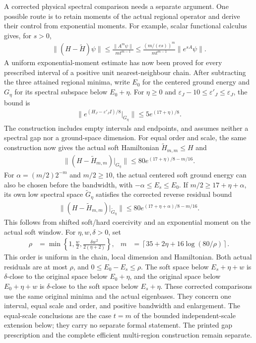 \documentclass{article}
\begin{document}
A corrected physical spectral comparison needs a separate argument.
One possible route is to retain moments of the actual regional operator
and derive their control from exponential moments. For example, scalar
functional calculus gives, for $s>0$,
\begin{align}
    \|(H-\widetilde H)\psi\|
    \le\frac{\|A^m\psi\|}{m t^{m-1}}
    \le\frac{(m/(es))^m}{m t^{m-1}}\|e^{sA}\psi\|.
    \label{eq:alvv_soft_possible_route}
\end{align}
A uniform exponential-moment estimate has now been proved for every
prescribed interval of a positive unit nearest-neighbour chain. After
subtracting the three attained regional minima, write $E_0$ for the
centered ground energy and $G_\eta$ for its spectral subspace below
$E_0+\eta$. For $\eta\ge0$ and
$\varepsilon_J-10\le\varepsilon'_J\le\varepsilon_J$, the bound is
\begin{align}
    \bigl\|e^{(H_J-\varepsilon'_J I)/8}|_{G_\eta}\bigr\|
    \le 5e^{(17+\eta)/8}.
    \label{eq:alvv_soft_window_exponential_bound}
\end{align}
The construction includes empty intervals and endpoints, and assumes
neither a spectral gap nor a ground-space dimension. For equal order and
scale, the same construction now gives the actual soft Hamiltonian
$\widetilde H_{m,m}\le H$ and
\begin{align}
    \bigl\|(H-\widetilde H_{m,m})|_{G_\eta}\bigr\|
    \le80e^{(17+\eta)/8-m/16}.
    \label{eq:alvv_soft_original_window_residual}
\end{align}
For $\alpha=(m/2)2^{-m}$ and $m/2\ge10$, the actual centered soft
ground energy can also be chosen before the bandwidth, with
$-\alpha\le E_s\le E_0$. If $m/2\ge17+\eta+\alpha$, its own low spectral
space $\widetilde G_\eta$ satisfies the corrected reverse residual bound
\begin{align}
    \bigl\|(H-\widetilde H_{m,m})|_{\widetilde G_\eta}\bigr\|
    \le80e^{(17+\eta+\alpha)/8-m/16}.
    \label{eq:alvv_soft_reverse_window_residual}
\end{align}
This follows from shifted soft/hard coercivity and an exponential moment on
the actual soft window. For $\eta,w,\delta>0$, set
\begin{align}
    \rho                                  & =\min\left\{1,\frac w2,
    \frac{\delta w^2}{2(\eta+2)}\right\}, &
    m                                     & =\left\lceil35+2\eta+16\log(80/\rho)\right\rceil.
    \label{eq:alvv_soft_equal_scale_parameters}
\end{align}
This order is uniform in the chain, local dimension and Hamiltonian. Both
actual residuals are at most $\rho$, and $0\le E_0-E_s\le\rho$.
The soft space below $E_s+\eta+w$ is $\delta$-close to the original space
below $E_0+\eta$, and the original space below $E_0+\eta+w$ is
$\delta$-close to the soft space below $E_s+\eta$. These corrected
comparisons use the same original minima and the actual eigenbases. They
concern one interval, equal scale and order, and positive bandwidth and
enlargement. The equal-scale conclusions are the case $t=m$ of the bounded
independent-scale extension below; they carry no separate formal statement. The printed gap prescription and the complete efficient
multi-region construction remain separate.
\end{document}
